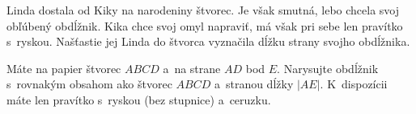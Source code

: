 \createTaskHeader
Linda dostala od Kiky na narodeniny štvorec. Je však smutná, lebo chcela svoj obľúbený obdĺžnik.
Kika chce svoj omyl napraviť, má však pri sebe len pravítko s~ryskou. Našťastie jej Linda do štvorca
vyznačila dĺžku strany svojho obdĺžnika.

Máte na papier štvorec $ABCD$ a~na strane $AD$ bod $E$. Narysujte obdĺžnik s~rovnakým obsahom ako
štvorec $ABCD$ a~stranou dĺžky $|AE|$. K~dispozícii máte len pravítko s~ryskou (bez stupnice) a~ceruzku.
